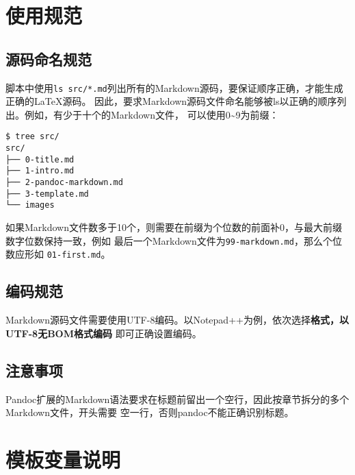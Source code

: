 \documentclass[fancyhdr,bookmark]{ctexbook}
\newcommand{\passthrough}[1]{#1}
\begin{document}
\hypertarget{ux4f7fux7528ux89c4ux8303}{%
\section{使用规范}\label{ux4f7fux7528ux89c4ux8303}}

\hypertarget{ux6e90ux7801ux547dux540dux89c4ux8303}{%
\subsection{源码命名规范}\label{ux6e90ux7801ux547dux540dux89c4ux8303}}

脚本中使用\passthrough{\lstinline!ls src/*.md!}列出所有的Markdown源码，要保证顺序正确，才能生成正确的LaTeX源码。
因此，要求Markdown源码文件命名能够被ls以正确的顺序列出。例如，有少于十个的Markdown文件，
可以使用0\textasciitilde9为前缀：

\begin{lstlisting}
$ tree src/
src/
├── 0-title.md
├── 1-intro.md
├── 2-pandoc-markdown.md
├── 3-template.md
└── images
\end{lstlisting}

如果Markdown文件数多于10个，则需要在前缀为个位数的前面补0，与最大前缀数字位数保持一致，例如
最后一个Markdown文件为\passthrough{\lstinline!99-markdown.md!}，那么个位数应形如
\passthrough{\lstinline!01-first.md!}。

\hypertarget{ux7f16ux7801ux89c4ux8303}{%
\subsection{编码规范}\label{ux7f16ux7801ux89c4ux8303}}

Markdown源码文件需要使用UTF-8编码。以Notepad++为例，依次选择\textbf{格式，以UTF-8无BOM格式编码}
即可正确设置编码。

\hypertarget{title:note}{%
\subsection{注意事项}\label{title:note}}

Pandoc扩展的Markdown语法要求在标题前留出一个空行，因此按章节拆分的多个Markdown文件，开头需要
空一行，否则pandoc不能正确识别标题。

\hypertarget{ux6a21ux677fux53d8ux91cfux8bf4ux660e}{%
\section{模板变量说明}\label{ux6a21ux677fux53d8ux91cfux8bf4ux660e}}
\end{document}
